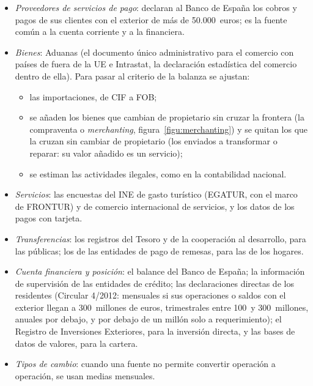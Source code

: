 \documentclass[11pt]{article}
\begin{document}
\begin{itemize}
\item \emph{Proveedores de servicios de pago}: declaran al Banco de España los cobros y pagos de sus clientes con el exterior de más de 50.000~euros\nocite{BdE2012Circular1,BdE2025NotaMet}; es la fuente común a la cuenta corriente y a la financiera.
\item \emph{Bienes}: Aduanas (el documento único administrativo para el comercio con países de fuera de la UE e Intrastat, la declaración estadística del comercio dentro de ella). Para pasar al criterio de la balanza se ajustan:
  \begin{itemize}
  \item las importaciones, de CIF a FOB;
  \item se añaden los bienes que cambian de propietario sin cruzar la frontera (la compraventa o \emph{merchanting}, figura~\ref{figu:merchanting}) y se quitan los que la cruzan sin cambiar de propietario (los enviados a transformar o reparar: su valor añadido es un servicio);
  \item se estiman las actividades ilegales, como en la contabilidad nacional.
  \end{itemize}
\item \emph{Servicios}: las encuestas del INE de gasto turístico (EGATUR, con el marco de FRONTUR) y de comercio internacional de servicios, y los datos de los pagos con tarjeta\nocite{BdE2025NotaMet}.
\item \emph{Transferencias}: los registros del Tesoro y de la cooperación al desarrollo, para las públicas; los de las entidades de pago de remesas, para las de los hogares.
\item \emph{Cuenta financiera y posición}: el balance del Banco de España; la información de supervisión de las entidades de crédito; las declaraciones directas de los residentes (Circular 4/2012: mensuales si sus operaciones o saldos con el exterior llegan a 300~millones de euros, trimestrales entre 100~y 300~millones, anuales por debajo, y por debajo de un millón solo a requerimiento)\nocite{BOE2012Circular4}; el Registro de Inversiones Exteriores, para la inversión directa, y las bases de datos de valores, para la cartera.
\item \emph{Tipos de cambio}: cuando una fuente no permite convertir operación a operación, se usan medias mensuales.
\end{itemize}

\begin{infografia}[H]
\centering
\caption{La compraventa (\emph{merchanting}) en la balanza de pagos}\label{figu:merchanting}
\end{infografia}
\end{document}

